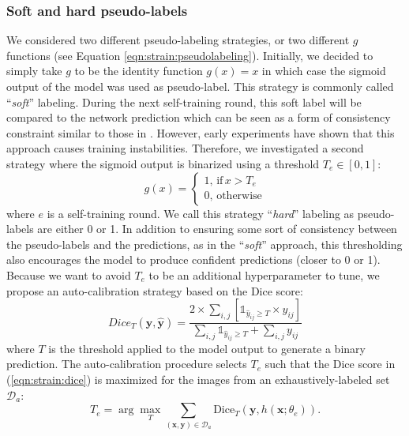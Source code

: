 \subsubsection{Soft and hard pseudo-labels}
\label{sssec:strain:softandhardlabels}

We considered two different pseudo-labeling strategies, or two different $g$ functions (see Equation \ref{eqn:strain:pseudolabeling}). Initially, we decided to simply take $g$ to be the identity function $g(x) = x$ in which case the sigmoid output of the model was used as pseudo-label. This strategy is commonly called  ``\textit{soft}'' labeling. During the next self-training round, this soft label will be compared to the network prediction which can be seen as a form of consistency constraint similar to those in \cite{laine2016temporal,tarvainen2017mean,sohn2020fixmatch}. However, early experiments have shown that this approach causes training instabilities. Therefore, we investigated a second strategy where the sigmoid output is binarized using a threshold $T_e \in [0, 1]$:
\begin{equation}
g(x) = \begin{cases}
1,\,\text{if}\, x > T_e\\
0,\,\text{otherwise}
\end{cases}
\end{equation}   
where $e$ is a self-training round. We call this strategy ``\textit{hard}'' labeling as pseudo-labels are either 0 or 1. In addition to ensuring some sort of consistency between the pseudo-labels and the predictions, as in the ``\textit{soft}'' approach, this thresholding also encourages the model to produce confident predictions (closer to 0 or 1). Because we want to avoid $T_e$ to be an additional hyperparameter to tune, we propose an auto-calibration strategy based on the Dice score: 
\begin{equation}
  Dice_T(\mathbf{y},\hat{\mathbf{y}}) = \dfrac{2 \times \sum_{i,j} \left[\mathbb{1}_{\hat{y}_{ij} \geq T} \times y_{ij}\right]}{\sum_{i,j} \mathbb{1}_{\hat{y}_{ij} \geq T} + \sum_{i,j} y_{ij}}
  \label{eqn:strain:dice}
\end{equation}
where $T$ is the threshold applied to the model output to generate a binary prediction. The auto-calibration procedure selects $T_e$ such that the Dice score in (\ref{eqn:strain:dice}) is maximized for the images from an exhaustively-labeled set  $\mathcal{D}_{a}$:
\begin{equation}
T_e = \arg \underset{T}{\max} \sum_{(\mathbf{x}, \mathbf{y}) \in \mathcal{D}_a} \text{Dice}_T\left(\mathbf{y},h( \mathbf{x}; \theta_{e})\right).
\label{eqn:strain:thresholdopt}
\end{equation}
